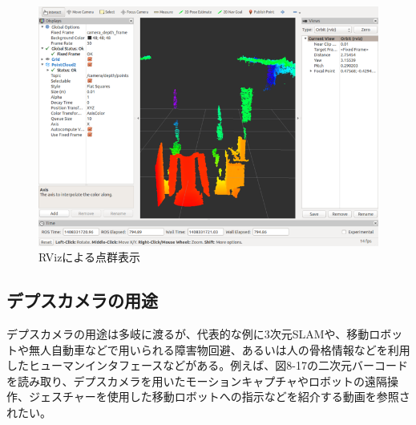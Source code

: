 \begin{figure}[ht]
  \centering
  \includegraphics[width=\columnwidth]{pictures/chapter8/pic_08_17.png}
  \caption{RVizによる点群表示}
\end{figure}

\subsection{デプスカメラの用途}

デプスカメラの用途は多岐に渡るが、代表的な例に3次元SLAMや、移動ロボットや無人自動車などで用いられる障害物回避、あるいは人の骨格情報などを利用したヒューマンインタフェースなどがある。例えば、図8-17の二次元バーコードを読み取り、デプスカメラを用いたモーションキャプチャやロボットの遠隔操作、ジェスチャーを使用した移動ロボットへの指示などを紹介する動画を参照されたい。

